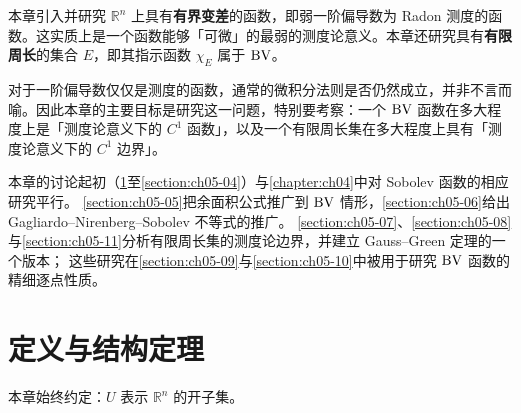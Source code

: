\documentclass[../../main.tex]{subfiles}%
\begin{document}
本章引入并研究 $\mathbb{R}^n$ 上具有\textbf{有界变差}的函数，即弱一阶偏导数为 Radon 测度的函数。这实质上是一个函数能够「可微」的最弱的测度论意义。本章还研究具有\textbf{有限周长}的集合 $E$，即其指示函数 $\chi_E$ 属于 $\mathrm{BV}$。

对于一阶偏导数仅仅是测度的函数，通常的微积分法则是否仍然成立，并非不言而喻。因此本章的主要目标是研究这一问题，特别要考察：一个 $\mathrm{BV}$ 函数在多大程度上是「测度论意义下的 $C^1$ 函数」，以及一个有限周长集在多大程度上具有「测度论意义下的 $C^1$ 边界」。

本章的讨论起初（\cref{section:ch05-01}至\cref{section:ch05-04}）与\cref{chapter:ch04}中对 Sobolev 函数的相应研究平行。%
\cref{section:ch05-05}把余面积公式推广到 $\mathrm{BV}$ 情形，\cref{section:ch05-06}给出 Gagliardo--Nirenberg--Sobolev 不等式的推广。%
\cref{section:ch05-07}、\cref{section:ch05-08}与\cref{section:ch05-11}分析有限周长集的测度论边界，并建立 Gauss--Green 定理的一个版本；%
这些研究在\cref{section:ch05-09}与\cref{section:ch05-10}中被用于研究 $\mathrm{BV}$ 函数的精细逐点性质。%

\section{定义与结构定理}\label{section:ch05-01}

本章始终约定：$U$ 表示 $\mathbb{R}^n$ 的开子集。%
\end{document}
